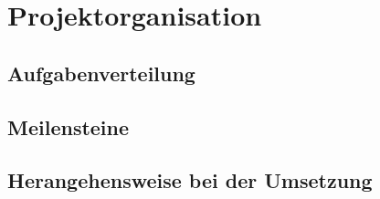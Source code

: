 \clearpage
\chapter{Projektorganisation}
\section{Aufgabenverteilung}
\section{Meilensteine}
\section{Herangehensweise bei der Umsetzung}